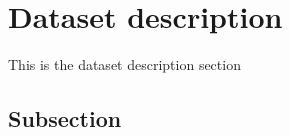 \section{Dataset description}\label{Section label}
This is the dataset description section
\subsection{Subsection}\label{subsection}